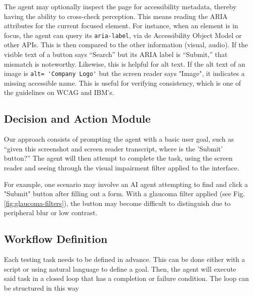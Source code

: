 The agent may optionally inspect the page for accessibility metadata, thereby having the ability to cross-check perception. This means reading the ARIA attributes for the current focused element. For instance, when an element is in focus, the agent can query its \verb|aria-label|, via de Accessibility Object Model or other APIs. %
This is then compared to the other information (visual, audio). If the visible text of a button says “Search” but its ARIA label is “Submit,” that mismatch is noteworthy. Likewise, this is helpful for alt text. If the alt text of an image is \verb|alt= 'Company Logo'| but the screen reader says "Image", it indicates a missing accessible name. This is useful for verifying consistency, which is one of the guidelines on \ac{WCAG} and IBM's\cite{ibm2025accessibility}.


\subsection{Decision and Action Module}

Our approach consists of prompting the agent with a basic user goal, such as “given this screenshot and screen reader transcript, where is the 'Submit' button?” The agent will then attempt to complete the task, using the screen reader and seeing through the visual impairment filter applied to the interface.

For example, one scenario may involve an \ac{AI} agent attempting to find and click a "Submit" button after filling out a form. With a glaucoma filter applied (see Fig. \ref{fig:glaucoma-filters}), the button may become difficult to distinguish due to peripheral blur or low contrast.


\subsection{Workflow Definition}

Each testing task needs to be defined in advance. This can be done either with a script or using natural language to define a goal. Then, the agent will execute said task in a closed loop that has a completion or failure condition. The loop can be structured in this way

